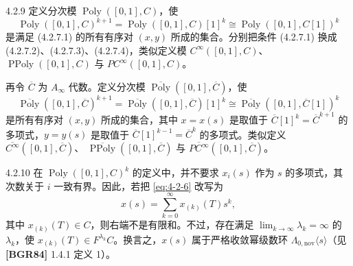 \begin{definition}{4.2.9}\label{def:4-2-9}
定义分次模 $\operatorname{Poly}([0,1],C)$，使
\[
 \operatorname{Poly}([0,1],C)^{k+1}
 =\operatorname{Poly}([0,1],C)[1]^k
 \cong\operatorname{Poly}([0,1],C[1])^k
\]
是满足 (4.2.7.1) 的所有有序对 $(x,y)$ 所成的集合。分别把条件
(4.2.7.1) 换成 (4.2.7.2)、(4.2.7.3)、(4.2.7.4)，类似定义模
$C^\infty([0,1],C)$、$\operatorname{PPoly}([0,1],C)$ 与
$PC^\infty([0,1],C)$。

再令 $\overline C$ 为 $A_\infty$ 代数。定义分次模
$\overline{\operatorname{Poly}}([0,1],\overline C)$，使
\[
 \overline{\operatorname{Poly}}([0,1],\overline C)^{k+1}
 =\overline{\operatorname{Poly}}([0,1],\overline C)[1]^k
 \cong\overline{\operatorname{Poly}}([0,1],\overline C[1])^k
\]
是所有有序对 $(x,y)$ 所成的集合，其中 $x=x(s)$ 是取值于
$\overline C[1]^k=\overline C^{k+1}$ 的多项式，$y=y(s)$ 是取值于
$\overline C[1]^{k-1}=\overline C^k$ 的多项式。类似定义
$\overline{C^\infty}([0,1],\overline C)$、
$\overline{\operatorname{PPoly}}([0,1],\overline C)$ 与
$\overline{PC^\infty}([0,1],\overline C)$。
\end{definition}

\begin{remark}{4.2.10}\label{rem:4-2-10}
在 $\operatorname{Poly}([0,1],C)^k$ 的定义中，并不要求 $x_i(s)$ 作为
$s$ 的多项式，其次数关于 $i$ 一致有界。因此，若把
\eqref{eq:4-2-6} 改写为
\begin{equation}
 x(s)=\sum_{k=0}^{\infty}x_{(k)}(T)s^k,
\tag{4.2.11}\label{eq:4-2-11}
\end{equation}
其中 $x_{(k)}(T)\in C$，则右端不是有限和。不过，存在满足
$\lim_{k\to\infty}\lambda_k=\infty$ 的 $\lambda_k$，使
$x_{(k)}(T)\in F^{\lambda_k}C$。换言之，$x(s)$ 属于严格收敛幂级数环
$\Lambda_{0,\mathrm{nov}}\langle s\rangle$（见 \textbf{[BGR84]}
1.4.1 定义 1）。
\end{remark}

